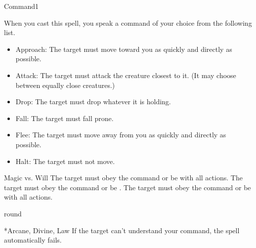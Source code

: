 \begin{spellsection}{Command}{1}
\begin{spellheader}
\end{spellheader}
\begin{spellcontent}
    \begin{spelltargetinginfo}
    \end{spelltargetinginfo}
    \begin{spelleffects}
        \spellspecial When you cast this spell, you speak a command of your choice from the following list.
        \begin{itemize}
                \item Approach: The target must move toward you as quickly and directly as possible.
                \item Attack: The target must attack the creature closest to it. (It may choose between equally close creatures.)
                \item Drop: The target must drop whatever it is holding.
                \item Fall: The target must fall prone.
                \item Flee: The target must move away from you as quickly and directly as possible.
                \item Halt: The target must not move.
        \end{itemize}
        \begin{spellattack}{Magic vs. Will}
            \spellsuccess The target must obey the command or be \severelyimpaired with all actions.
            \spellcritical The target must obey the command or be \stunned.
            \spellfailure The target must obey the command or be \impaired with all actions.
        \end{spellattack}
         round
    \end{spelleffects}
\end{spellcontent}
\begin{spellfooter}
    *{Arcane, Divine, Law}
    \spellnotes If the target can't understand your command, the spell automatically fails.
\end{spellfooter}
\end{spellsection}

